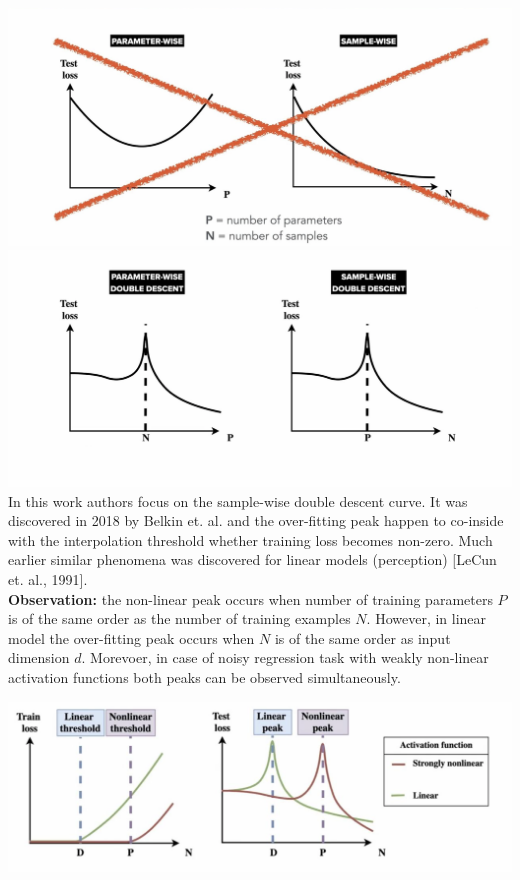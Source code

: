 \includegraphics[scale=0.25]{neurips-2020/images/Screenshot 2020-12-09 at 18.45.09.png}
\includegraphics[scale=0.25]{neurips-2020/images/Screenshot 2020-12-09 at 18.48.59.png} \\

In this work authors focus on the sample-wise double descent curve. It was discovered in 2018 by Belkin et. al. \cite{belkin2019reconciling} and the over-fitting peak happen to co-inside with the interpolation threshold whether training loss becomes non-zero. Much earlier similar phenomena was discovered for linear models (perception) [LeCun et. al., 1991]. \\

{\bf Observation:} the non-linear peak occurs when number of training parameters $P$ is of the same order as the number of training examples $N$. However, in linear model the over-fitting peak occurs when $N$ is of the same order as input dimension $d$. Morevoer, in case of noisy regression task with weakly non-linear activation functions both peaks can be observed simultaneously. \\ 
\begin{center}
  \includegraphics[scale=0.5]{neurips-2020/images/Screenshot 2020-12-09 at 19.14.11.png} \\
\end{center}

